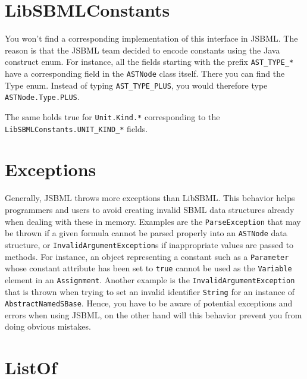 \documentclass[a4paper,11pt]{scrartcl}
\begin{document}
\section{LibSBMLConstants}

You won't find a corresponding implementation of this interface in 
JSBML. The reason is that the JSBML team decided to encode constants using the
Java construct enum. For instance, all the fields starting with the
prefix \verb!AST_TYPE_*! have a corresponding field in the \verb!ASTNode! class
itself. There you can find the Type enum. Instead of typing
\verb!AST_TYPE_PLUS!, you would therefore type \verb!ASTNode.Type.PLUS!.

The same holds true for \verb!Unit.Kind.*! corresponding to the 
\verb!LibSBMLConstants.UNIT_KIND_*! fields.

\section{Exceptions}

Generally, JSBML throws more exceptions than LibSBML. This behavior helps
programmers and users to avoid creating invalid SBML data structures already
when dealing with these in memory. Examples are the \verb!ParseException! that
may be thrown if a given formula cannot be parsed properly into an \verb!ASTNode!
data structure, or \verb!InvalidArgumentException!s if inappropriate values are
passed to methods. For instance, an object representing a constant such as a
\verb!Parameter! whose constant attribute has been set to \verb!true! cannot be
used as the \verb!Variable! element in an \verb!Assignment!. Another example is
the \verb!InvalidArgumentException! that is thrown when trying to set an invalid
identifier \verb!String! for an instance of \verb!AbstractNamedSBase!. Hence,
you have to be aware of potential exceptions and errors when using JSBML, on the
other hand will this behavior prevent you from doing obvious mistakes.


\section{ListOf}
\end{document}
